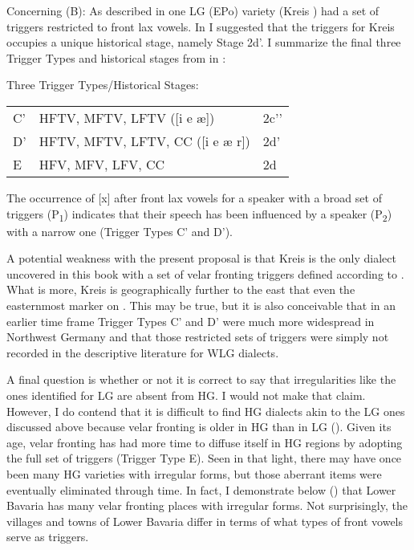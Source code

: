 Concerning (B): As described in  one LG (EPo) variety (Kreis ) had a set of triggers restricted to front lax vowels. In  I suggested that the triggers for Kreis  occupies a unique historical stage, namely Stage 2d'. I summarize the final three Trigger Types and historical stages from  in :

\ea%
\label{ex:12:23}
Three Trigger Types/Historical Stages:\smallskip\\
\begin{tabular}[t]{@{}lll@{}}
C' & HFTV, MFTV, LFTV ([i e æ]) & 2c'{}'\\
D' & HFTV, MFTV, LFTV, CC ([i e æ r]) & 2d'\\
E  & HFV, MFV, LFV, CC & 2d\\
\end{tabular}
\z

The occurrence of [x] after front lax vowels for a speaker with a broad set of triggers (P\textsubscript{1}) indicates that their speech has been influenced by a speaker (P\textsubscript{2}) with a narrow one (Trigger Types C' and D').

A potential weakness with the present proposal is that Kreis  is the only dialect uncovered in this book with a set of velar fronting triggers defined according to . What is more, Kreis  is geographically further to the east that even the easternmost marker on . This may be true, but it is also conceivable that in an earlier time frame Trigger Types C' and D' were much more widespread in Northwest Germany and that those restricted sets of triggers were simply not recorded in the descriptive literature for WLG dialects.

A final question is whether or not it is correct to say that irregularities like the ones identified for LG are absent from HG. I would not make that claim. However, I do contend that it is difficult to find HG dialects akin to the LG ones discussed above because velar fronting is older in HG than in LG (). Given its age, velar fronting has had more time to diffuse itself in HG regions by adopting the full set of triggers (Trigger Type E). Seen in that light, there may have once been many HG varieties with irregular forms, but those aberrant items were eventually eliminated through time. In fact, I demonstrate below () that Lower Bavaria has many velar fronting places with irregular forms. Not surprisingly, the villages and towns of Lower Bavaria differ in terms of what types of front vowels serve as triggers.

